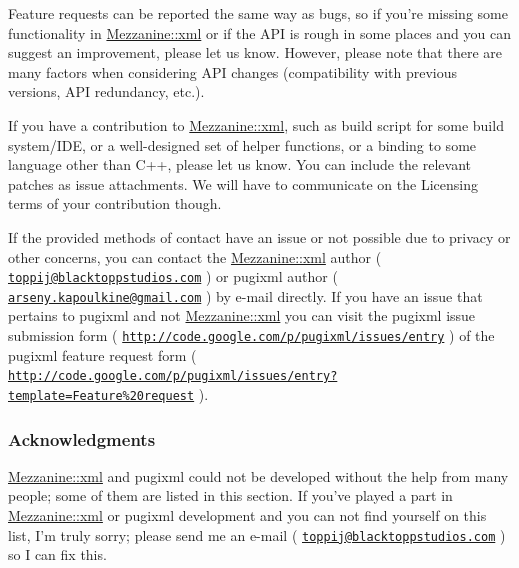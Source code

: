 \par
 Feature requests can be reported the same way as bugs, so if you're missing some functionality in \hyperlink{namespaceMezzanine_1_1xml}{Mezzanine::xml} or if the API is rough in some places and you can suggest an improvement, please let us know. However, please note that there are many factors when considering API changes (compatibility with previous versions, API redundancy, etc.). \par
 \par
 If you have a contribution to \hyperlink{namespaceMezzanine_1_1xml}{Mezzanine::xml}, such as build script for some build system/IDE, or a well-\/designed set of helper functions, or a binding to some language other than C++, please let us know. You can include the relevant patches as issue attachments. We will have to communicate on the Licensing terms of your contribution though. \par
 \par
 If the provided methods of contact have an issue or not possible due to privacy or other concerns, you can contact the \hyperlink{namespaceMezzanine_1_1xml}{Mezzanine::xml} author ( \href{mailto:toppij@blacktoppstudios.com}{\tt toppij@blacktoppstudios.com} ) or pugixml author ( \href{mailto:arseny.kapoulkine@gmail.com}{\tt arseny.kapoulkine@gmail.com} ) by e-\/mail directly. If you have an issue that pertains to pugixml and not \hyperlink{namespaceMezzanine_1_1xml}{Mezzanine::xml} you can visit the pugixml issue submission form ( \href{http://code.google.com/p/pugixml/issues/entry}{\tt http://code.google.com/p/pugixml/issues/entry} ) of the pugixml feature request form ( \href{http://code.google.com/p/pugixml/issues/entry?template=Feature%20request}{\tt http://code.google.com/p/pugixml/issues/entry?template=Feature\%20request} ). \par
 \par
 \hypertarget{XMLManual_XMLAcknowledgments}{}\subsubsection{Acknowledgments}\label{XMLManual_XMLAcknowledgments}
\hyperlink{namespaceMezzanine_1_1xml}{Mezzanine::xml} and pugixml could not be developed without the help from many people; some of them are listed in this section. If you've played a part in \hyperlink{namespaceMezzanine_1_1xml}{Mezzanine::xml} or pugixml development and you can not find yourself on this list, I'm truly sorry; please send me an e-\/mail ( \href{mailto:toppij@blacktoppstudios.com}{\tt toppij@blacktoppstudios.com} ) so I can fix this. \par
